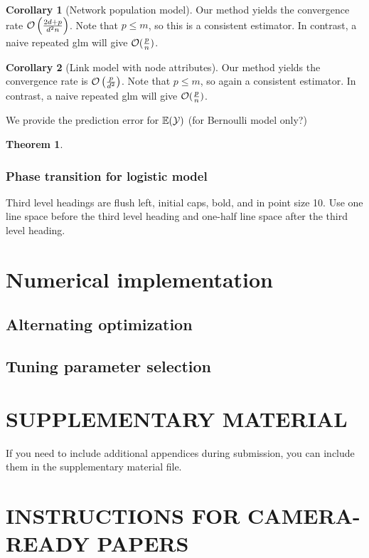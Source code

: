 \documentclass[twoside]{article}
\theoremstyle{plain}
\newtheorem{thm}{Theorem}[section]
\theoremstyle{definition}
\newtheorem{cor}{Corollary}
\begin{document}
\begin{cor} [Network population model] Our method yields the convergence rate $\mathcal{O}\left({2d+p\over d^2n}\right)$. Note that $p\leq m$, so this is a consistent estimator. In contrast, a naive repeated glm will give $\mathcal{O}({p\over n})$.
\end{cor}

\begin{cor} [Link model with node attributes] Our method yields the convergence rate is $\mathcal{O}\left({p\over d^2}\right)$. Note that $p\leq m$, so again a consistent estimator. In contrast, a naive repeated glm will give $\mathcal{O}({p\over n})$.
\end{cor}

We provide the prediction error for $\mathbb{E}(\mathcal{Y})$ (for Bernoulli model only?)
\begin{thm} 
\end{thm}

\subsubsection{Phase transition for logistic model}

Third level headings are flush left, initial caps, bold, and in point
size 10. Use one line space before the third level heading and one-half line
space after the third level heading.

\section{Numerical implementation}
\subsection{Alternating optimization}
\subsection{Tuning parameter selection}



\section{SUPPLEMENTARY MATERIAL}

If you need to include additional appendices during submission, you
can include them in the supplementary material file.



\section{INSTRUCTIONS FOR CAMERA-READY PAPERS}
\end{document}
